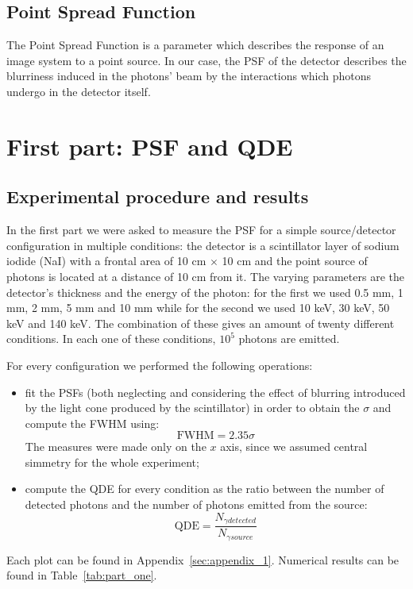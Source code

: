\documentclass[a4paper]{article}
\begin{document}
\subsection{Point Spread Function}
The Point Spread Function is a parameter which describes the response of an image system to a point source. In our case, the PSF of the detector describes the blurriness induced in the photons' beam by the interactions which photons undergo in the detector itself.

\section{First part: PSF and QDE}
\subsection{Experimental procedure and results}
In the first part we were asked to measure the PSF for a simple source/detector configuration in multiple conditions: the detector is a scintillator layer of sodium iodide (NaI) with a frontal area of 10 cm $\times$ 10 cm and the point source of photons is located at a distance of 10 cm from it. The varying parameters are the detector's thickness and the energy of the photon: for the first we used 0.5 mm, 1 mm, 2 mm, 5 mm and 10 mm while for the second we used 10 keV, 30 keV, 50 keV and 140 keV. The combination of these gives an amount of twenty different conditions. In each one of these conditions, $10^5$ photons are emitted.

For every configuration we performed the following operations:
\begin{itemize}
  \item fit the PSFs (both neglecting and considering the effect of blurring introduced by the light cone produced by the scintillator) in order to obtain the $\sigma$ and compute the FWHM using:
    \begin{equation}
      \text{FWHM}=2.35\sigma
      \label{eq:fwhm}
    \end{equation}
    The measures were made only on the $x$ axis, since we assumed central simmetry for the whole experiment;
  \item compute the QDE for every condition as the ratio between the number of detected photons and the number of photons emitted from the source:
    \begin{equation}
      \text{QDE}=\frac{N_{\gamma detected}}{N_{\gamma source}}
      \label{eq:qde}
    \end{equation}
\end{itemize}
Each plot can be found in Appendix~\ref{sec:appendix_1}. Numerical results can be found in Table~\ref{tab:part_one}.
\end{document}
